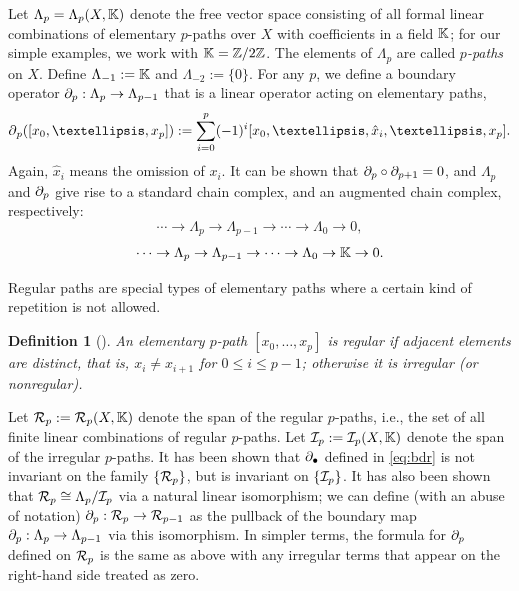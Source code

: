 \documentclass{amsart}
\newtheorem{definition}[theorem]{Definition}
\newcommand{\Z}{\mathbb{Z}}
\newcommand{\bdr}{\mm{\mathrm{\partial}}}
\newcommand {\mm}[1]        {\ifmmode{#1}\else{\mbox{\(#1\)}}\fi}
\newcommand{\Kspace}        {\mm{{\mathbb K}}}
\newcommand{\Rcal}        {\mm{\mathcal R}}
\newcommand{\Ical}        {\mm{\mathcal I}}
\newcommand{\ie}            {{i.e.}}
\begin{document}
Let $\Lambda_p = \Lambda_p(X, \Kspace)$ denote the free vector space consisting of all formal linear combinations of elementary $p$-paths over $X$ with coefficients in a field $\Kspace$; for our simple examples, we work with $\Kspace = \Z/2\Z$. 
The elements of $\Lambda_p$ are called \emph{$p$-paths} on $X$.
Define $\Lambda_{-1} := \Kspace$ and $\Lambda_{-2} := \{0\}$.
For any $p$, we define a boundary operator $\bdr_p: \Lambda_{p} \to \Lambda_{p-1}$ that is a linear operator acting on elementary paths, 
\begin{align}
\bdr_p ([x_0, \dots, x_p]) := \sum_{i=0}^{p}(-1)^i[x_0, \dots, \hat{x}_i, \dots, x_p].
\label{eq:bdr}
\end{align}
Again, $\hat{x}_i$ means the omission of $x_i$.
It can be shown that $\bdr_p \circ \bdr_{p+1} = 0$, and $\Lambda_p$ and $\bdr_p$ give rise to a standard chain complex, and an augmented chain complex, respectively:   
\[
\cdots  \to \Lambda_p \to \Lambda_{p-1} \to \cdots \to \Lambda_0 \to 0, 
\]
\[
\cdots  \to \Lambda_p \to \Lambda_{p-1} \to \cdots \to \Lambda_0 \to \Kspace \to 0.  
\]

Regular paths are special types of elementary paths where a certain kind of repetition is not allowed. 
\begin{definition}[{\cite[page 567]{GrigoryanLinMuranov2020}}]
An elementary $p$-path $[x_0, \dots, x_p]$ is \emph{regular} if adjacent elements are distinct, that is, $x_i \neq x_{i+1}$ for $0 \leq i \leq p-1$; otherwise it is \emph{irregular (or nonregular)}. 
\end{definition} 
Let $\Rcal_p:=\Rcal_p(X, \Kspace)$ denote the span of the regular $p$-paths, \ie, the set of all finite linear combinations of regular $p$-paths. 
Let $\Ical_p:=\Ical_p(X, \Kspace)$ denote the span of the irregular $p$-paths. 
It has been shown that $\bdr_\bullet$ defined in \eqref{eq:bdr} is not invariant on the family $\{\Rcal_p\}$, but is invariant on $\{\Ical_p\}$.
It has also been shown that $\Rcal_p \cong \Lambda_p / \Ical_p$ via a natural linear isomorphism; we can define (with an abuse of notation) $\bdr_p: \Rcal_p \to \Rcal_{p-1}$ as the pullback of the boundary map $\bdr_p: \Lambda_p \to \Lambda_{p-1}$ via this isomorphism. 
In simpler terms, the formula for $\bdr_p$ defined on $\Rcal_p$ is the same as above with any irregular terms that appear on the right-hand side treated as zero.
\end{document}
